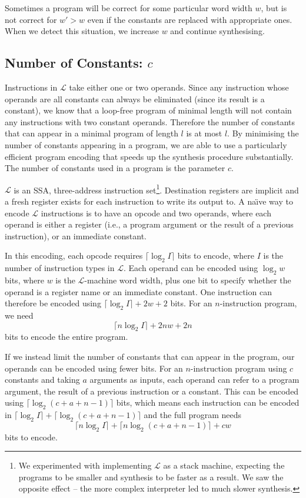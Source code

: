 \documentclass[a4paper]{llncs}
\begin{document}
Sometimes a program will be correct for some particular word width $w$, but is
not correct for $w' > w$ even if the constants are replaced with appropriate ones.
When we detect this situation, we increase $w$ and continue synthesising.

\subsection{Number of Constants: $c$}
Instructions in $\mathcal{L}$ take either one or two operands.
Since any instruction whose operands are all constants can always be
eliminated (since its result is a constant), we know that a loop-free program
of minimal length will not contain any instructions with two constant
operands.  Therefore the number of constants that can appear in
a minimal program of length $l$ is at most $l$.  By minimising the number
of constants appearing in a program, we are able to use a particularly
efficient program encoding that speeds up the synthesis procedure
substantially.  The number of constants used in a program is the parameter $c$.

$\mathcal{L}$ is an SSA, three-address instruction set\footnote{
We experimented with implementing $\mathcal{L}$ as a stack machine, expecting
the programs to be smaller and synthesis to be faster as a result.  We saw
the opposite effect -- the more complex interpreter led to much slower synthesis.
}.  Destination registers
are implicit and a fresh register exists for each instruction to write its
output to.  A na\"{\i}ve way to encode $\mathcal{L}$ instructions is to have an
opcode and two operands, where each operand is either a register (i.e., a program argument
or the result of a previous instruction), or an immediate constant.

In this encoding, each opcode requires $\lceil \log_2 I \rceil$ bits to encode, where $I$ is the number
of instruction types in $\mathcal{L}$.  Each operand can be encoded using
$\log_2 w$ bits, where $w$ is the $\mathcal{L}$-machine word width, plus one
bit to specify whether the operand is a register name or an immediate constant.
One instruction can therefore be encoded using $\lceil \log_2 I \rceil + 2w + 2$ bits.
For an $n$-instruction program, we need $$\lceil n \log_2 I \rceil + 2nw + 2n$$ bits to encode
the entire program.

If we instead limit the number of constants that can appear in the program,
our operands can be encoded using fewer bits.  For an $n$-instruction program
using $c$ constants and taking $a$ arguments as inputs, each operand can refer
to a program argument, the result of a previous instruction or a constant.
This can be encoded using $\lceil \log_2 (c+a+n-1) \rceil$ bits, which means each instruction
can be encoded in $\lceil \log_2 I \rceil + \lceil \log_2 (c + a + n - 1) \rceil$ and the full program
needs $$\lceil n \log_2 I \rceil + \lceil n \log_2 (c + a + n - 1) \rceil + cw$$ bits to encode.
\end{document}
